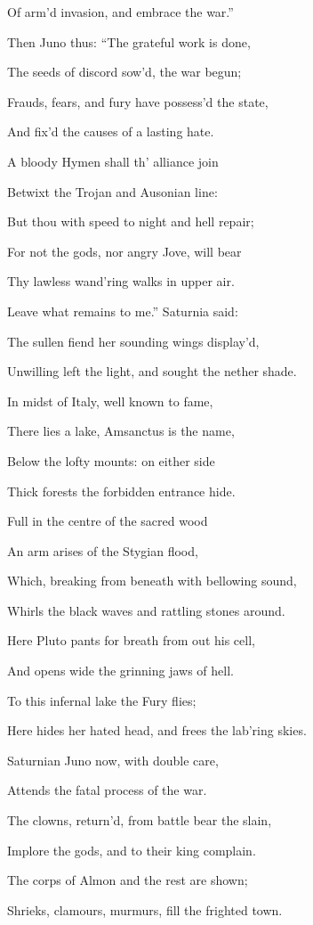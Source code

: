 Of arm’d invasion, and embrace the war.”

Then Juno thus: “The grateful work is done,

The seeds of discord sow’d, the war begun;

Frauds, fears, and fury have possess’d the state,

And fix’d the causes of a lasting hate.

A bloody Hymen shall th’ alliance join

Betwixt the Trojan and Ausonian line:

But thou with speed to night and hell repair;

For not the gods, nor angry Jove, will bear

Thy lawless wand’ring walks in upper air.

Leave what remains to me.” Saturnia said:

The sullen fiend her sounding wings display’d,

Unwilling left the light, and sought the nether shade.

In midst of Italy, well known to fame,

There lies a lake, Amsanctus is the name,

Below the lofty mounts: on either side

Thick forests the forbidden entrance hide.

Full in the centre of the sacred wood

An arm arises of the Stygian flood,

Which, breaking from beneath with bellowing sound,

Whirls the black waves and rattling stones around.

Here Pluto pants for breath from out his cell,

And opens wide the grinning jaws of hell.

To this infernal lake the Fury flies;

Here hides her hated head, and frees the lab’ring skies.

Saturnian Juno now, with double care,

Attends the fatal process of the war.

The clowns, return’d, from battle bear the slain,

Implore the gods, and to their king complain.

The corps of Almon and the rest are shown;

Shrieks, clamours, murmurs, fill the frighted town.

